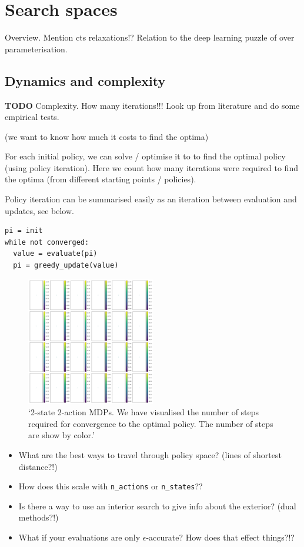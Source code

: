 \section{Search spaces}

Overview.
Mention cts relaxations!?
Relation to the deep learning puzzle of over parameterisation.

\subsection{Dynamics and complexity}

\textbf{TODO} Complexity. How many iterations!!! Look up from literature
and do some empirical tests.

(we want to know how much it costs to find the optima)

For each initial policy, we can solve / optimise it to to find the
optimal policy (using policy iteration). Here we count how many
iterations were required to find the optima (from different starting
points / policies).

Policy iteration can be summarised easily as an iteration between
evaluation and updates, see below.

\begin{verbatim}
pi = init
while not converged:
  value = evaluate(pi)
  pi = greedy_update(value)
\end{verbatim}

\begin{figure}
\centering
\includegraphics[width=0.5\textwidth,height=0.5\textheight]{../../pictures/figures/gpi-partitions.png}
\caption{`2-state 2-action MDPs. We have visualised the number of steps
required for convergence to the optimal policy. The number of steps are
show by color.'}
\end{figure}

\begin{itemize}
\tightlist
\item
  What are the best ways to travel through policy space? (lines of
  shortest distance?!)
\item
  How does this scale with \texttt{n\_actions} or \texttt{n\_states}??
\item
  Is there a way to use an interior search to give info about the
  exterior? (dual methods?!)
\item
  What if your evaluations are only \(\epsilon\)-accurate? How does that
  effect things?!?
\end{itemize}

